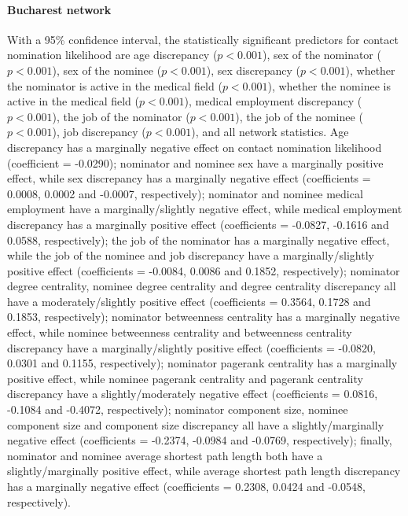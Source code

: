\paragraph{Bucharest network} With a 95\% confidence interval, the statistically significant predictors for contact nomination likelihood are age discrepancy ($p<0.001$), sex of the nominator ($p<0.001$), sex of the nominee ($p<0.001$), sex discrepancy ($p<0.001$), whether the nominator is active in the medical field ($p<0.001$), whether the nominee is active in the medical field ($p<0.001$), medical employment discrepancy ($p<0.001$), the job of the nominator ($p<0.001$), the job of the nominee ($p<0.001$), job discrepancy ($p<0.001$), and all network statistics. Age discrepancy has a marginally negative effect on contact nomination likelihood (coefficient = -0.0290); nominator and nominee sex have a marginally positive effect, while sex discrepancy has a marginally negative effect (coefficients = 0.0008, 0.0002 and -0.0007, respectively); nominator and nominee medical employment have a marginally/slightly negative effect, while medical employment discrepancy has a marginally positive effect (coefficients = -0.0827, -0.1616 and 0.0588, respectively); the job of the nominator has a marginally negative effect, while the job of the nominee and job discrepancy have a marginally/slightly positive effect (coefficients = -0.0084, 0.0086 and 0.1852, respectively); nominator degree centrality, nominee degree centrality and degree centrality discrepancy all have a moderately/slightly positive effect (coefficients = 0.3564, 0.1728 and 0.1853, respectively); nominator betweenness centrality has a marginally negative effect, while nominee betweenness centrality and betweenness centrality discrepancy have a marginally/slightly positive effect (coefficients = -0.0820, 0.0301 and 0.1155, respectively); nominator pagerank centrality has a marginally positive effect, while nominee pagerank centrality and pagerank centrality discrepancy have a slightly/moderately negative effect (coefficients = 0.0816, -0.1084 and -0.4072, respectively); nominator component size, nominee component size and component size discrepancy all have a slightly/marginally negative effect (coefficients = -0.2374, -0.0984 and -0.0769, respectively); finally, nominator and nominee average shortest path length both have a slightly/marginally positive effect, while average shortest path length discrepancy has a marginally negative effect (coefficients = 0.2308, 0.0424 and -0.0548, respectively).

